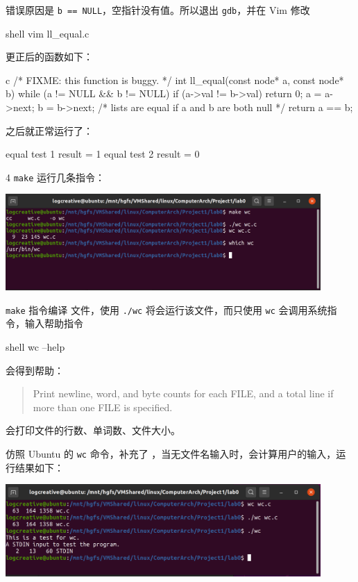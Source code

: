 \documentclass[12pt,a4paper]{article}
\newenvironment{problems}{\begin{list}{}{\renewcommand{\makelabel}[1]{\textbf{##1}.\hfil}}}{\end{list}}
\begin{document}
\begin{problems}
    错误原因是 \texttt{b == NULL}，空指针没有值。所以退出 \texttt{gdb}，并在 Vim 修改
    \begin{code}{shell}
        vim ll_equal.c
    \end{code}

    更正后的函数如下：

    \begin{code}{c}
/* FIXME: this function is buggy. */
int ll_equal(const node* a, const node* b) {
	while (a != NULL && b != NULL) {
		if (a->val != b->val)
			return 0;
		a = a->next;
		b = b->next;
	}
	/* lists are equal if a and b are both null */
	return a == b;
}
    \end{code}

    之后就正常运行了：
    \begin{literal}
equal test 1 result = 1
equal test 2 result = 0
    \end{literal}

    \item[4] \texttt{make}
    运行几条指令：
    
    \includegraphics[width=0.9\textwidth]{make.png}

    \texttt{make} 指令编译  文件，使用 \texttt{./wc} 将会运行该文件，而只使用 \texttt{wc} 会调用系统指令，输入帮助指令
    \begin{code}{shell}
        wc --help
    \end{code}
    会得到帮助：
    \begin{quote}
        Print newline, word, and byte counts for each FILE, and a total line if more than one FILE is specified.
    \end{quote}
    会打印文件的行数、单词数、文件大小。

    仿照 Ubuntu 的 \texttt{wc} 命令，补充了 ，当无文件名输入时，会计算用户的输入，运行结果如下：

    \includegraphics[width=0.9\textwidth]{wc.png}

    \inputminted[breaklines,autogobble,linenos,numbersep=1mm,frame=lines,framesep=2mm,fontsize=\scriptsize,]{c}{../lab0/wc.c}

\end{problems}
\end{document}
